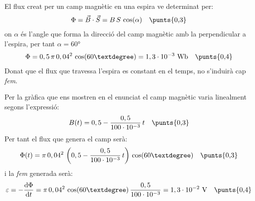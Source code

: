 \begin{solapartat}
El flux creat per un camp magnètic en una espira ve determinat per:
\[ \Phi = \vec{B}\cdot\vec{S} = B\,S\,\cos(\alpha) \quad \text{\punts{0,3}} \]
on $\alpha$ és l'angle que forma la direcció del camp magnètic amb la perpendicular a l'espira, per tant $\alpha = 60°$
\[ \Phi = 0,5\,\pi\,0,04^2\,\cos(60°) = 1,3\cdot 10^{-3}\ \mathrm{Wb} \quad \text{\punts{0,4}} \]
Donat que el flux que travessa l'espira es constant en el temps, no s'induirà cap \textit{fem}. 
\end{solapartat}

\begin{solapartat}
Per la gràfica que ens mostren en el enunciat el camp magnètic varia linealment segons l'expressió:
\[ B(t) = 0,5 - \frac{0,5}{100\cdot 10^{-3}}\,t \quad \text{\punts{0,3}} \]
Per tant el flux que genera el camp serà:
\[ \Phi(t) = \pi\,0,04^2\,\left(0,5 - \frac{0,5}{100\cdot 10^{-3}}\,t\right)\,\cos(60°) \quad \text{\punts{0,3}} \]
i la \textit{fem} generada serà:
\[ \varepsilon = -\frac{\mathrm{d}\Phi}{\mathrm{d}t} = \pi\,0,04^2\,\cos(60°)\,\frac{0,5}{100\cdot 10^{-3}} = 1,3\cdot 10^{-2}\ \mathrm{V} \quad \text{\punts{0,4}} \]
\end{solapartat}
